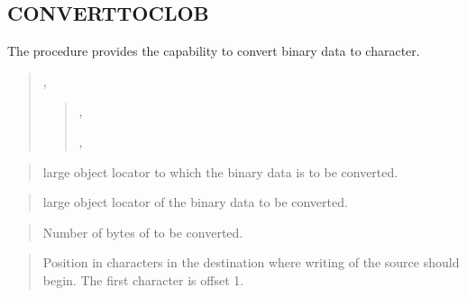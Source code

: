 \documentclass[letterpaper,10pt,english,openany,oneside]{sphinxmanual}
\begin{document}
\subsection{CONVERTTOCLOB}
\label{\detokenize{converttoclob::doc}}\label{\detokenize{converttoclob:converttoclob}}
The  procedure provides the capability to convert binary
data to character.
\begin{quote}

,
\begin{quote}

,

,

\end{quote}
\end{quote}


\begin{quote}

 large object locator to which the binary data is to be converted.
\end{quote}

\begin{quote}

 large object locator of the binary data to be converted.
\end{quote}

\begin{quote}

Number of bytes of  to be converted.
\end{quote}

\begin{quote}

Position in characters in the destination  where writing of the
source  should begin. The first character is offset 1.
\end{quote}
\end{document}
